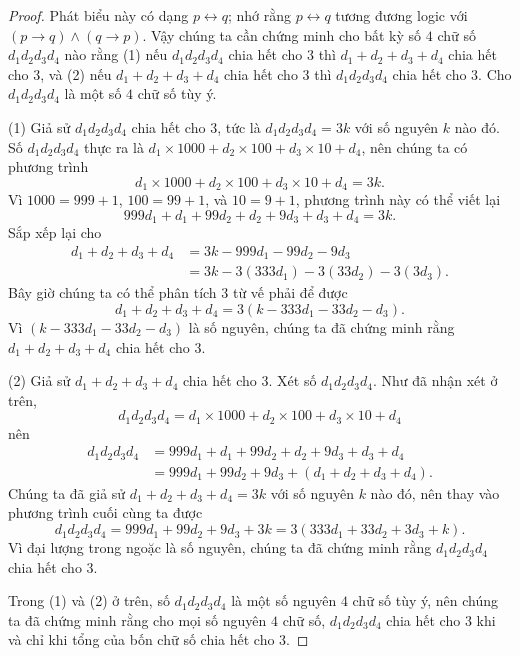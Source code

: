 \begin{proof}
Phát biểu này có dạng $p \leftrightarrow q$; nhớ rằng $p \leftrightarrow q$ tương đương logic với $(p \to q) \wedge (q \to p)$. Vậy chúng ta cần chứng minh cho bất kỳ số $4$ chữ số $d_1d_2d_3d_4$ nào rằng (1) nếu $d_1d_2d_3d_4$ chia hết cho $3$ thì $d_1 + d_2 + d_3 + d_4$ chia hết cho $3$, và (2) nếu $d_1 + d_2 + d_3 + d_4$ chia hết cho $3$ thì $d_1d_2d_3d_4$ chia hết cho $3$. Cho $d_1d_2d_3d_4$ là một số $4$ chữ số tùy ý.

(1) Giả sử $d_1d_2d_3d_4$ chia hết cho $3$, tức là $d_1d_2d_3d_4 = 3k$ với số nguyên $k$ nào đó. Số $d_1d_2d_3d_4$ thực ra là $d_1 \times 1000 + d_2 \times 100 + d_3 \times 10 + d_4$, nên chúng ta có phương trình
\[d_1 \times 1000 + d_2 \times 100 + d_3 \times 10 + d_4 = 3k.\]
Vì $1000 = 999 + 1$, $100 = 99 + 1$, và $10 = 9 + 1$, phương trình này có thể viết lại
\[999d_1 + d_1 + 99d_2 + d_2 + 9d_3 + d_3 + d_4 = 3k.\]
Sắp xếp lại cho
\begin{align*}
d_1 + d_2 + d_3 + d_4 &= 3k - 999d_1 - 99d_2 - 9d_3 \\
&= 3k - 3(333d_1) - 3(33d_2) - 3(3d_3).
\end{align*}
Bây giờ chúng ta có thể phân tích $3$ từ vế phải để được
\[d_1 + d_2 + d_3 + d_4 = 3(k - 333d_1 - 33d_2 - d_3).\]
Vì $(k - 333d_1 - 33d_2 - d_3)$ là số nguyên, chúng ta đã chứng minh rằng $d_1 + d_2 + d_3 + d_4$ chia hết cho $3$.

(2) Giả sử $d_1 + d_2 + d_3 + d_4$ chia hết cho $3$. Xét số $d_1d_2d_3d_4$. Như đã nhận xét ở trên,
\[d_1d_2d_3d_4 = d_1 \times 1000 + d_2 \times 100 + d_3 \times 10 + d_4\]
nên
\begin{align*}
d_1d_2d_3d_4 &= 999d_1 + d_1 + 99d_2 + d_2 + 9d_3 + d_3 + d_4 \\
&= 999d_1 + 99d_2 + 9d_3 + (d_1 + d_2 + d_3 + d_4).
\end{align*}
Chúng ta đã giả sử $d_1 + d_2 + d_3 + d_4 = 3k$ với số nguyên $k$ nào đó, nên thay vào phương trình cuối cùng ta được
\[d_1d_2d_3d_4 = 999d_1 + 99d_2 + 9d_3 + 3k = 3(333d_1 + 33d_2 + 3d_3 + k).\]
Vì đại lượng trong ngoặc là số nguyên, chúng ta đã chứng minh rằng $d_1d_2d_3d_4$ chia hết cho $3$.

Trong (1) và (2) ở trên, số $d_1d_2d_3d_4$ là một số nguyên $4$ chữ số tùy ý, nên chúng ta đã chứng minh rằng cho mọi số nguyên $4$ chữ số, $d_1d_2d_3d_4$ chia hết cho $3$ khi và chỉ khi tổng của bốn chữ số chia hết cho $3$.
\end{proof}

